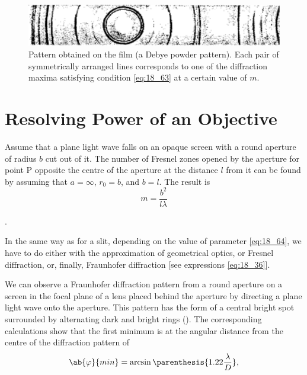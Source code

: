 \begin{figure}[!htb]
	\begin{center}
		\includegraphics[scale=1.0]{figures/ch_18/fig_18_46.pdf}
        \caption[]{Pattern obtained on the film (a Debye powder pattern). Each pair of symmetrically arranged lines corresponds to one of the diffraction maxima satisfying condition \eqref{eq:18_63} at a certain value of $m$.}
		\label{fig:18_46}
	\end{center}
	\vspace{-0.8cm}
\end{figure}

\section{Resolving Power of an Objective}\label{sec:18_8}
\vspace{-0.1cm}
Assume that a plane light wave falls on an opaque screen with a round aperture of radius $b$ cut out of it.
The number of Fresnel zones opened by the aperture for point P opposite the centre of the
aperture at the distance $l$ from it can be found by  assuming that $a=\infty$, $r_0=b$, and $b=l$.
The result is
\begin{equation}\label{eq:18_64}
	m = \frac{b^2}{l \lambda}
\end{equation}

.

In the same way as for a slit, depending on the value of parameter \eqref{eq:18_64}, we have to do either with the approximation of geometrical optics, or Fresnel diffraction, or, finally, Fraunhofer diffraction [see expressions \eqref{eq:18_36}].

We can observe a Fraunhofer diffraction pattern from a round aperture on a screen in the focal plane of a lens placed behind the aperture by directing a plane light wave onto the aperture.
This pattern has the form of a central bright spot surrounded by alternating dark and bright rings ().
The corresponding calculations show that the first minimum is at the angular distance from the centre of the diffraction pattern of
\begin{equation}\label{eq:18_65}
	\ab{\varphi}{min} = \arcsin\parenthesis{1.22\frac{\lambda}{D}},
\end{equation}

